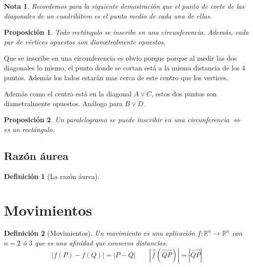 \documentclass[11pt, a4paper]{article}
\makeatletter
\newif\IfInSansMode
\let\oldsf\sffamily
\renewcommand*{\sffamily}{\oldsf\mathversion{sans}\InSansModetrue}
\let\oldnorm\normalfont
\renewcommand*{\normalfont}{\oldnorm\InSansModefalse\mathversion{normal}}
\renewenvironment{proof}[1][\proofname] {\vspace{-15pt}\par\pushQED{\qed}\normalfont\topsep6\p@\@plus6\p@\relax\trivlist\item[\hskip\labelsep\it#1\@addpunct{.}]\ignorespaces}{\popQED\endtrivlist\@endpefalse}
\newcommand{\R}{\mathbb{R}}
\renewcommand{\vec}{\overrightarrow}
\renewenvironment{proof}[1][\proofname] {\par\pushQED{\qed}\normalfont\topsep6\p@\@plus6\p@\relax\trivlist\item[\hskip\labelsep\itshape\sffamily#1\@addpunct{.}]\ignorespaces}{\popQED\endtrivlist\@endpefalse}
\theoremstyle{theorem-style}
\newtheorem{nprop}{Proposición}[section]
\theoremstyle{definition-style}
\newtheorem{ndef}{Definición}[section]
\theoremstyle{remark-style}
\newtheorem*{nota}{Nota}
\theoremstyle{example-style}
\makeatother
\begin{document}
\begin{nota}
	Recordemos para la siguiente demostración que el punto de corte de las diagonales de un cuadrilátero es el punto medio de cada una de ellas.
\end{nota}

\begin{nprop}
  Todo rectángulo se inscribe en una circunferencia. Además, cada par de vértices opuestos son diametralmente opuestos.
\end{nprop}

\begin{proof}
	Que se inscribe en una circunferencia es obvio porque porque al medir las dos diagonales lo mismo, el punto donde se cortan está a la misma distancia de los 4 puntos. Además los lados estarán mas cerca de este centro que los vertices. 
	
	Además como el centro está en la diagonal $A\vee C$, estos dos puntos son diametralmente opuestos. Análogo para $B\vee D$.
\end{proof}

\begin{nprop}
  Un paralelogramo se puede inscribir en una circunferencia $\iff$ es un rectángulo.
\end{nprop}

\subsection {Razón áurea}
\begin{ndef}[La razón áurea]
  
\end{ndef}

\newpage

\section{Movimientos}

\begin{ndef}[Movimientos]
  Un movimiento es una aplicación $f:\R^n \to \R^n$ con $n= 2$ ó $3$ que es una afinidad que conserva distancias.
  \[
    |f(P)-f(Q)|= |P-Q| \quad  \quad |\vec{f}(\vec{QP})|= |\vec{QP}|
  \]
\end{ndef}
\end{document}
